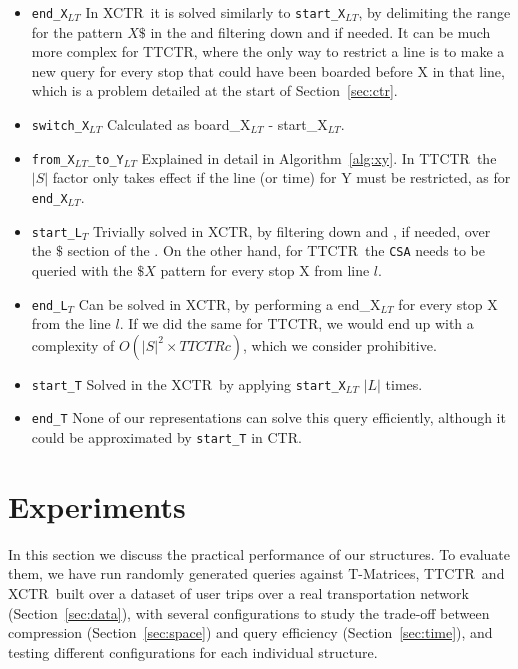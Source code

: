 \documentclass[runningheads]{llncs}
\newcommand{\acumm}{T-Matrices} %
\newcommand{\ctr}{XCTR}
\newcommand{\ttctr}{TTCTR}
\newcommand{\ttctrq}{TTCTRc}
\begin{document}
\begin{itemize}
    \item \texttt{end\_X$_{LT}$} In \ctr~it is solved similarly to \texttt{start\_X$_{LT}$}, by delimiting the range for the pattern $X\$$ in the  and filtering down  and  if needed. It can be much more complex for \ttctr, where the only way to restrict a line is to make a new query for every stop that could have been boarded before X in that line, which is a problem detailed at the start of Section~\ref{sec:ctr}.
    \item \texttt{switch\_X$_{LT}$} Calculated as board\_X$_{LT}$ - start\_X$_{LT}$.
    \item \texttt{from\_X$_{LT}$\_to\_Y$_{LT}$} Explained in detail in Algorithm~\ref{alg:xy}. In \ttctr~the $|S|$ factor only takes effect if the line (or time) for Y must be restricted, as for \texttt{end\_X$_{LT}$}.
    \item \texttt{start\_L$_T$} Trivially solved in \ctr, by filtering down  and , if needed, over the $\$$ section of the . On the other hand, for \ttctr~the \texttt{CSA} needs to be queried with the $\$X$ pattern for every stop X from line $l$.
    \item \texttt{end\_L$_T$} Can be solved in \ctr, by performing a end\_X$_{LT}$ for every stop X from the line $l$. If we did the same for \ttctr, we would end up with a complexity of $O(|S|^2\times\ttctrq)$, which we consider prohibitive.
    \item \texttt{start\_T} Solved in the \ctr~by applying \texttt{start\_X$_{LT}$} $|L|$ times.
    \item \texttt{end\_T} None of our representations can solve this query efficiently, although it could be approximated by \texttt{start\_T} in CTR.
\end{itemize}

\section{Experiments}
\label{sec:exp}
In this section we discuss the practical performance of our structures. To evaluate them, we have run randomly generated queries against \acumm, \ttctr~and \ctr~built over a dataset of user trips over a real transportation network (Section~\ref{sec:data}), with several configurations to study the trade-off between compression (Section~\ref{sec:space}) and query efficiency (Section~\ref{sec:time}), and testing different configurations for each individual structure.
\end{document}
